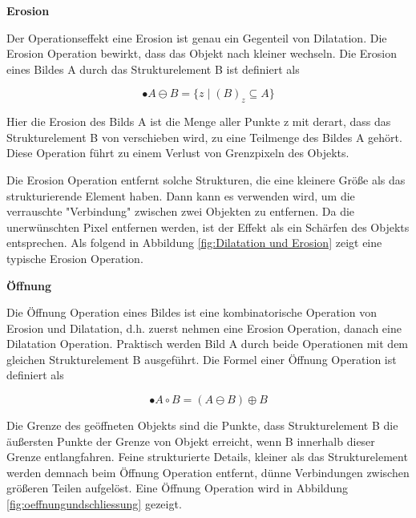 \textbf{Erosion}

Der Operationseffekt eine Erosion ist genau ein Gegenteil von Dilatation. Die Erosion Operation bewirkt, dass das Objekt nach kleiner wechseln. Die Erosion eines Bildes A durch das Strukturelement B ist definiert als 

\begin{equation}
•A \ominus B =\lbrace z \mid (B)_z \subseteq A \rbrace  
\end{equation}

Hier die Erosion des Bilds A ist die Menge aller Punkte z mit derart, dass das Strukturelement B von verschieben wird, zu eine Teilmenge des Bildes A 	gehört. Diese Operation führt zu einem Verlust von Grenzpixeln des Objekts.

Die Erosion Operation entfernt solche Strukturen, die eine kleinere Größe als das strukturierende Element haben. Dann kann es verwenden wird, um die verrauschte "Verbindung" zwischen zwei Objekten zu entfernen. Da die unerwünschten Pixel entfernen werden, ist der Effekt als ein Schärfen des Objekts entsprechen. Als folgend in Abbildung \ref{fig:Dilatation und Erosion} zeigt eine typische Erosion Operation.


\textbf{Öffnung}

Die Öffnung Operation eines Bildes ist eine kombinatorische Operation von Erosion und Dilatation, d.h. zuerst nehmen eine Erosion Operation, danach eine Dilatation Operation. Praktisch werden Bild A durch beide Operationen mit dem gleichen Strukturelement B ausgeführt. Die Formel einer Öffnung Operation ist definiert als

\begin{equation}
•A \circ B =( A \ominus B )\oplus B  
\end{equation}

Die Grenze des geöffneten Objekts sind die Punkte, dass Strukturelement B die äußersten Punkte der Grenze von Objekt erreicht, wenn B innerhalb dieser Grenze entlangfahren. Feine strukturierte Details,
kleiner als das Strukturelement werden demnach beim Öffnung Operation entfernt, dünne Verbindungen zwischen größeren Teilen aufgelöst. Eine Öffnung Operation wird in Abbildung \ref{fig:oeffnungundschliessung} gezeigt.


